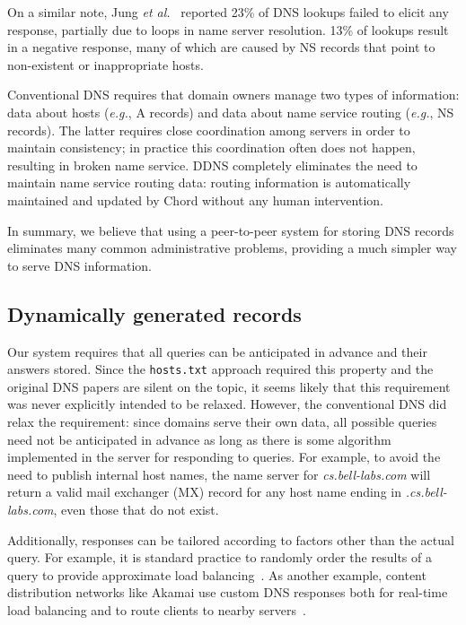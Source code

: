 On a similar note, Jung {\it et al.}~\cite{dnscache:sigcommimw01} 
reported 23\% of 
DNS lookups failed to elicit any response, partially due to loops 
in name server resolution. 13\% of lookups result in a negative 
response, many of which are caused by NS records that point to 
non-existent or inappropriate hosts.

Conventional DNS requires that domain owners manage two types of
information: data about hosts ({\em e.g.}, A records)
and data about name service routing ({\em e.g.}, NS records).
The latter requires close coordination among servers in order
to maintain consistency; in practice this coordination often
does not happen, resulting in broken name service.
DDNS completely eliminates the need to maintain name
service routing data: routing information is automatically
maintained and updated by Chord without any human intervention.

In summary, we believe that using a peer-to-peer system for
storing DNS records eliminates many common administrative
problems, providing a much simpler way to serve DNS 
information.

\subsection{Dynamically generated records}

Our system requires that all queries
can be anticipated in advance and their answers stored.
Since the {\tt hosts.txt} approach required this property
and the original DNS papers are silent on the topic,
it seems likely that this requirement was never 
explicitly intended to be relaxed.
However, the conventional DNS did relax the requirement:
since domains serve their own data, all possible queries need 
not be anticipated in advance as long as there is some algorithm
implemented in the server for responding to queries.
For example, to avoid the need to publish internal host names,
the name server for
{\em cs.bell-labs.com} will return a valid mail exchanger (MX) record
for any host name ending in {\em .cs.bell-labs.com}, even
those that do not exist.

Additionally, responses can be tailored according to factors
other than the actual query.
For example, it is standard practice to randomly order the results
of a query to provide approximate load balancing~\cite{dns-load:rfc}.
As another example, content distribution networks like Akamai
use custom DNS responses both for real-time load balancing and
to route clients to nearby servers~\cite{akamai.rev.eng}.

